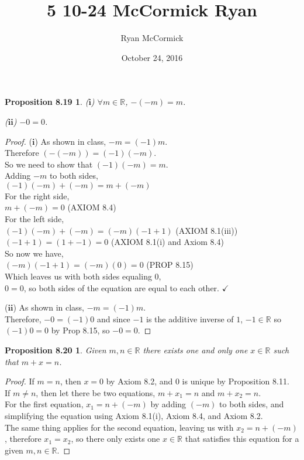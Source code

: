 \documentclass[12pt]{amsart}
\newcommand{\R}{\mathbb{R}}
\begin{document}
\title{5 10-24 McCormick Ryan}
\date{October 24, 2016}
\author{Ryan McCormick}

\maketitle

\theoremstyle{plain}
\newtheorem*{prop8.19}{Proposition 8.19}
\begin{prop8.19}
	\item[($\textbf{i}$)] $\forall m \in \R$, $-(-m)=m$.
	\item[($\textbf{ii}$)] $-0 = 0$.
\end{prop8.19}

\begin{proof}
	\item[($\textbf{i}$)] As shown in class, $-m=(-1)m$. \\
	Therefore $(-(-m)) = (-1)(-m)$. \\
	So we need to show that $(-1)(-m)=m$. \\
	Adding $-m$ to both sides, \\
	$(-1)(-m)+(-m)=m+(-m)$ \\
	For the right side, \\
	$m+(-m)=0$ (AXIOM 8.4) \\
	For the left side, \\
	$(-1)(-m)+(-m)=(-m)(-1 + 1)$ (AXIOM 8.1(iii)) \\
	$(-1 + 1) = (1 + -1) = 0$ (AXIOM 8.1(i) and Axiom 8.4) \\
	So now we have, \\
	$(-m)(-1 + 1) = (-m)(0) = 0$ (PROP 8.15) \\
	Which leaves us with both sides equaling 0, \\
	$0 = 0$, so both sides of the equation are equal to each other. $\checkmark$
	
	\item[($\textbf{ii}$)] As shown in class, $-m=(-1)m$. \\
	Therefore, $-0 = (-1)0$ and since $-1$ is the additive inverse of $1$, $-1 \in \R$ so $(-1)0 = 0$ by Prop 8.15, so $-0=0$.
\end{proof}

\newtheorem*{prop8.20}{Proposition 8.20}
\begin{prop8.20}
	Given $m,n \in \R$ there exists one and only one $x \in \R$ such that $m+x=n$.
\end{prop8.20}

\begin{proof}
	If $m=n$, then $x=0$ by Axiom 8.2, and $0$ is unique by Proposition 8.11. \\
	If $m \neq n$, then let there be two equations, $m+x_1 = n$ and $m+x_2 = n$. \\
	For the first equation, $x_1 = n + (-m)$ by adding $(-m)$ to both sides, and simplifying the equation using Axiom 8.1(i), Axiom 8.4, and Axiom 8.2. \\
	The same thing applies for the second equation, leaving us with $x_2 = n + (-m)$, therefore $x_1 = x_2$, so there only exists one $x \in \R$ that satisfies this equation for a given $m,n \in \R$.
\end{proof}
\end{document}
